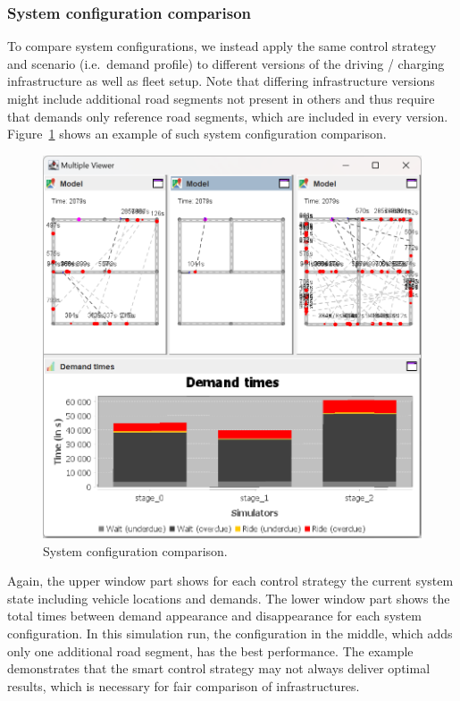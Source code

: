 \documentclass[a4paper,twoside]{article}
\begin{document}
	\subsubsection{System configuration comparison}
	\label{sec:infrastructure-comparison}
	
	To compare system configurations, we instead apply the same control strategy and scenario (i.e.\ demand profile) to different versions of the driving / charging infrastructure as well as fleet setup.
	Note that differing infrastructure versions might include additional road segments not present in others and thus require that demands only reference road segments, which are included in every version.
	Figure~\ref{fig:infratructure-comparison} shows an example of such system configuration comparison.
	\begin{figure}[!ht]
		\centering
		\includegraphics[width=0.85\columnwidth]{infrastructure_comparison.png}
		\caption{System configuration comparison.}
		\label{fig:infratructure-comparison}
	\end{figure}
	Again, the upper window part shows for each control strategy the current system state including vehicle locations and demands.
	The lower window part shows the total times between demand appearance and disappearance for each system configuration.
	In this simulation run, the configuration in the middle, which adds only one additional road segment, has the best performance.
	The example demonstrates that the smart control strategy may not always deliver optimal results, which is necessary for fair comparison of infrastructures.
	
\end{document}
